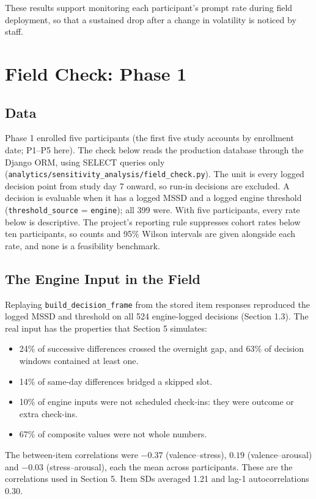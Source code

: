 \documentclass[11pt,letterpaper]{article}
\begin{document}
These results support monitoring each participant's prompt rate during field deployment, so that a sustained drop after a change in volatility is noticed by staff.

\section{Field Check: Phase 1}

\subsection{Data}

Phase 1 enrolled five participants (the first five study accounts by enrollment date; P1--P5 here). The check below reads the production database through the Django ORM, using SELECT queries only (\texttt{analytics/sensitivity\_analysis/field\_check.py}). The unit is every logged decision point from study day 7 onward, so run-in decisions are excluded. A decision is evaluable when it has a logged MSSD and a logged engine threshold (\texttt{threshold\_source} = \texttt{engine}); all 399 were. With five participants, every rate below is descriptive. The project's reporting rule suppresses cohort rates below ten participants, so counts and 95\% Wilson intervals are given alongside each rate, and none is a feasibility benchmark.

\subsection{The Engine Input in the Field}

Replaying \texttt{build\_decision\_frame} from the stored item responses reproduced the logged MSSD and threshold on all 524 engine-logged decisions (Section 1.3). The real input has the properties that Section 5 simulates:
\begin{itemize}
    \item 24\% of successive differences crossed the overnight gap, and 63\% of decision windows contained at least one.
    \item 14\% of same-day differences bridged a skipped slot.
    \item 10\% of engine inputs were not scheduled check-ins: they were outcome or extra check-ins.
    \item 67\% of composite values were not whole numbers.
\end{itemize}
The between-item correlations were $-0.37$ (valence--stress), $0.19$ (valence--arousal) and $-0.03$ (stress--arousal), each the mean across participants. These are the correlations used in Section 5. Item SDs averaged 1.21 and lag-1 autocorrelations 0.30.
\end{document}
